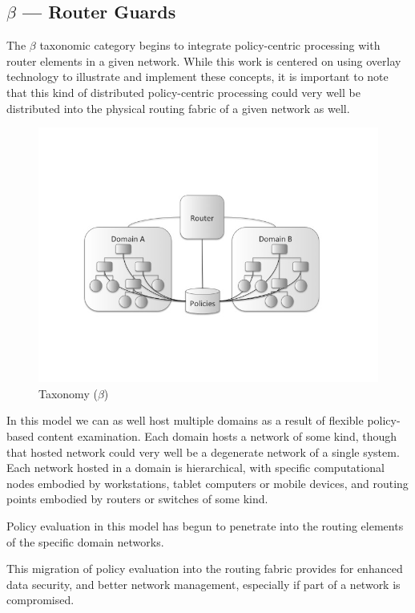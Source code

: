 \documentclass[12pt,letterpaper]{article}
\begin{document}
\subsection{$\beta$ --- Router Guards}
The $\beta$ taxonomic category begins to integrate policy-centric processing with router elements in a given network.  While this work is centered on using overlay technology to illustrate and implement these concepts, it is important to note that this kind of distributed policy-centric processing could very well be distributed into the physical routing fabric of a given network as well.

\begin{figure}[!t]
\centering
\includegraphics[width=5in]{model-beta}
\caption{Taxonomy ($\beta$)}
\label{fig:model:taxonomy-beta}
\end{figure}

In this model we can as well host multiple domains as a result of flexible policy-based content examination.  Each domain hosts a network of some kind, though that hosted network could very well be a degenerate network of a single system.  Each network hosted in a domain is hierarchical, with specific computational nodes embodied by workstations, tablet computers or mobile devices, and routing points embodied by routers or switches of some kind.

Policy evaluation in this model has begun to penetrate into the routing elements of the specific domain networks.

This migration of policy evaluation into the routing fabric provides for enhanced data security, and better network management, especially if part of a network is compromised.
\end{document}
